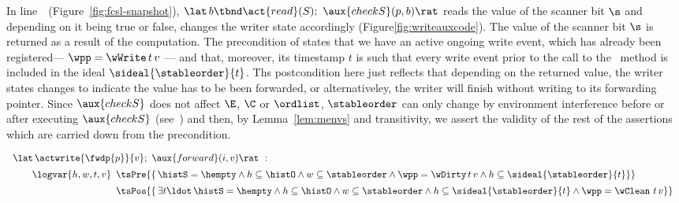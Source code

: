 In line~\lineWrtChk~(Figure~\ref{fig:fcsl-snapshot}), $ \lat\,
b \tbnd \act{read}(S);\ \aux{checkS}(p,b) \rat$ reads the value of the
scanner bit $\s$ and depending on it being true or false, 
changes the writer state accordingly
(Figure\ref{fig:writeauxcode}). The value of the scanner bit $\s$ is
returned as a result of the computation. The precondition
of  states that we have an active ongoing write event,
which has already been registered--- $ \wpp = \wWrite\, t\, v $ ---
and that, moreover, its timestamp $t$ is such that every write event
prior to the call to the \jywrite~method is included in the ideal
$\sideal{\stableorder}{t}$. Ths postcondition here just reflects that
depending on the returned value, the writer states changes to indicate
the value has to be been forwarded, or alternativeley, the writer will
finish without writing to its forwarding pointer. Since $\aux{checkS}$
does not affect $\E$, $\C$ or $\ordlist$, $\stableorder$ can only
change by environment interference before or after executing
$\aux{checkS}$ (see~\cite{NanevskiLSD+ESOP14}) and then, by
Lemma~\ref{lem:menvs} and transitivity, we assert the validity of the
rest of the assertions which are carried down from the precondition.


\[
\begin{array}{l}
\lat\, \actwrite{\fwdp{p}}{v};\ \aux{forward}(i,v)\rat\ :\\[5pt]
\quad\quad\logvar{h,w,t,v}
\begin{array}[t]{l}
\tsPre{\{\, \histS = \hempty \wedge h \subseteq \histO \wedge
             w \subseteq \stableorder \wedge
             \wpp = \wDirty\, t\, v \wedge
             h \subseteq \sideal{\stableorder}{t}\}}\ \\[5pt]
\tsPos{\{\, \exists t\ldot\, \histS = \hempty \wedge
            h \subseteq \histO \wedge  w \subseteq \stableorder \wedge
  h \subseteq \sideal{\stableorder}{t} \wedge
    \wpp = \wClean\ t\, v\}}
\end{array}
\end{array}
\]

